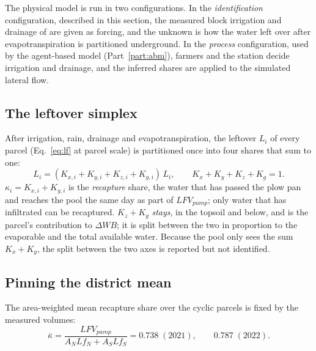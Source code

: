 \documentclass[11pt]{article}
\begin{document}
The physical model is run in two configurations. In the \emph{identification} configuration, described in this section, the measured block irrigation and drainage of \citet{Okura2025WaterBalance} are given as forcing, and the unknown is how the water left over after evapotranspiration is partitioned underground. In the \emph{process} configuration, used by the agent-based model (Part~\ref{part:abm}), farmers and the station decide irrigation and drainage, and the inferred shares are applied to the simulated lateral flow.

\subsection{The leftover simplex}
After irrigation, rain, drainage and evapotranspiration, the leftover $L_i$ of every parcel (Eq.~\ref{eq:lf} at parcel scale) is partitioned once into four shares that sum to one:
\begin{equation}
L_i = (K_{x,i} + K_{y,i} + K_{z,i} + K_{g,i})\,L_i, \qquad K_x + K_y + K_z + K_g = 1 .
\end{equation}
$\kappa_i = K_{x,i} + K_{y,i}$ is the \emph{recapture} share, the water that has passed the plow pan and reaches the pool the same day as part of $LFV_{pump}$; only water that has infiltrated can be recaptured. $K_z + K_g$ \emph{stays}, in the topsoil and below, and is the parcel's contribution to $\Delta WB$; it is split between the two in proportion to the evaporable and the total available water. Because the pool only sees the sum $K_x + K_y$, the split between the two axes is reported but not identified.

\subsection{Pinning the district mean}
The area-weighted mean recapture share over the cyclic parcels is fixed by the measured volumes:
\begin{equation}
\bar\kappa = \frac{LFV_{pump}}{A_N Lf_N + A_S Lf_S} = 0.738\;(2021), \qquad 0.787\;(2022).
\end{equation}
\end{document}
